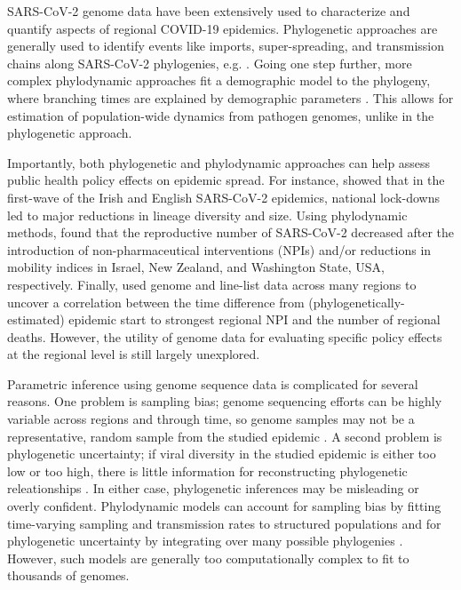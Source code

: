 \documentclass[9pt,twocolumn,twoside,lineno]{pnas-new}
\begin{document}
SARS-CoV-2 genome data have been extensively used to characterize and quantify aspects of regional COVID-19 epidemics. Phylogenetic approaches are generally used to identify events like imports, super-spreading, and transmission chains along SARS-CoV-2 phylogenies, e.g. \cite{Lu2020, Eden2020, OudeMunnink2020, Bluhm2020}. Going one step further, more complex phylodynamic approaches fit a demographic model to the phylogeny, where branching times are explained by demographic parameters \cite{Grenfell2004}. This allows for estimation of population-wide dynamics from pathogen genomes, unlike in the phylogenetic approach.

Importantly, both phylogenetic and phylodynamic approaches can help assess public health policy effects on epidemic spread. For instance, \cite{Mallon2020, duPlessis2021} showed that in the first-wave of the Irish and English SARS-CoV-2 epidemics, national lock-downs led to major reductions in lineage diversity and size. Using phylodynamic methods, \cite{Miller2020, Geoghegan2020a, Muller2020a} found that the reproductive number of SARS-CoV-2 decreased after the introduction of non-pharmaceutical interventions (NPIs) and/or reductions in mobility indices in Israel, New Zealand, and Washington State, USA, respectively. Finally, \cite{Ragonnet-Cronin2021} used genome and line-list data across many regions to uncover a correlation between the time difference from  (phylogenetically-estimated) epidemic start to strongest regional NPI and the number of regional deaths. However, the utility of genome data for evaluating specific policy effects at the regional level is still largely unexplored.

Parametric inference using genome sequence data is complicated for several reasons. One problem is sampling bias; genome sequencing efforts can be highly variable across regions and through time, so genome samples may not be a representative, random sample from the studied epidemic  \cite{Villabona-Arenas2020, DeMaio2015}. A second problem is phylogenetic uncertainty; if viral diversity in the studied epidemic is either too low or too high, there is little information for reconstructing phylogenetic releationships  \cite{Villabona-Arenas2020}. In either case, phylogenetic inferences may be misleading or overly confident. Phylodynamic models can account for sampling bias by fitting  time-varying sampling and transmission rates to structured populations and for phylogenetic uncertainty by integrating over many possible phylogenies \cite{Scire2020b}. However, such models are generally too computationally complex to fit to thousands of genomes. 
\end{document}
